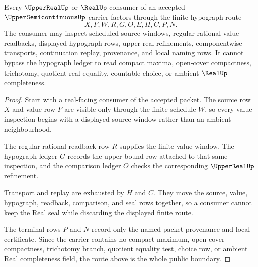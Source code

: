 \begin{theorem}
\label{thm:upper-semicontinuous-hypograph-route}
Every $\UpperRealUp$ or $\RealUp$ consumer of an accepted
$\UpperSemicontinuousUp$ carrier factors through the finite hypograph route
$$
X,F,W,R,G,O,E,H,C,P,N .
$$
The consumer may inspect scheduled source windows, regular rational value
readbacks, displayed hypograph rows, upper-real refinements, componentwise
transports, continuation replay, provenance, and local naming rows. It cannot
bypass the hypograph ledger to read compact maxima, open-cover compactness,
trichotomy, quotient real equality, countable choice, or ambient $\RealUp$
completeness.
\end{theorem}
\begin{proof}
Start with a real-facing consumer of the accepted packet. The source row $X$
and value row $F$ are visible only through the finite schedule $W$, so every
value inspection begins with a displayed source window rather than an ambient
neighbourhood.

The regular rational readback row $R$ supplies the finite value window. The
hypograph ledger $G$ records the upper-bound row attached to that same
inspection, and the comparison ledger $O$ checks the corresponding
$\UpperRealUp$ refinement.

Transport and replay are exhausted by $H$ and $C$. They move the source,
value, hypograph, readback, comparison, and seal rows together, so a consumer
cannot keep the Real seal while discarding the displayed finite route.

The terminal rows $P$ and $N$ record only the named packet provenance and local
certificate. Since the carrier contains no compact maximum, open-cover
compactness, trichotomy branch, quotient equality test, choice row, or ambient
Real completeness field, the route above is the whole public boundary.
\end{proof}

\begin{closurestatus}{\UpperSemicontinuousUp}
  \theoryclosure{\seedClosure}
  \formalstatus{\unformalizedV}
\end{closurestatus}
